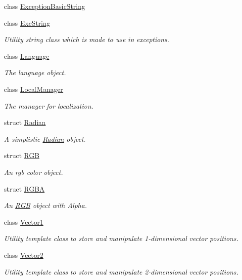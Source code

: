 \begin{DoxyCompactItemize}
class \hyperlink{class_tri_1_1_util_1_1_exception_basic_string}{Exception\+Basic\+String}
\item 
class \hyperlink{class_tri_1_1_util_1_1_exe_string}{Exe\+String}
\begin{DoxyCompactList}\small\item\em Utility string class which is made to use in exceptions. \end{DoxyCompactList}\item 
class \hyperlink{class_tri_1_1_util_1_1_language}{Language}
\begin{DoxyCompactList}\small\item\em The language object. \end{DoxyCompactList}\item 
class \hyperlink{class_tri_1_1_util_1_1_local_manager}{Local\+Manager}
\begin{DoxyCompactList}\small\item\em The manager for localization. \end{DoxyCompactList}\item 
struct \hyperlink{struct_tri_1_1_util_1_1_radian}{Radian}
\begin{DoxyCompactList}\small\item\em A simplistic \hyperlink{struct_tri_1_1_util_1_1_radian}{Radian} object. \end{DoxyCompactList}\item 
struct \hyperlink{struct_tri_1_1_util_1_1_r_g_b}{R\+G\+B}
\begin{DoxyCompactList}\small\item\em An rgb color object. \end{DoxyCompactList}\item 
struct \hyperlink{struct_tri_1_1_util_1_1_r_g_b_a}{R\+G\+B\+A}
\begin{DoxyCompactList}\small\item\em An \hyperlink{struct_tri_1_1_util_1_1_r_g_b}{R\+G\+B} object with Alpha. \end{DoxyCompactList}\item 
class \hyperlink{class_tri_1_1_util_1_1_vector1}{Vector1}
\begin{DoxyCompactList}\small\item\em Utility template class to store and manipulate 1-\/dimensional vector positions. \end{DoxyCompactList}\item 
class \hyperlink{class_tri_1_1_util_1_1_vector2}{Vector2}
\begin{DoxyCompactList}\small\item\em Utility template class to store and manipulate 2-\/dimensional vector positions. \end{DoxyCompactList}\end{DoxyCompactItemize}
